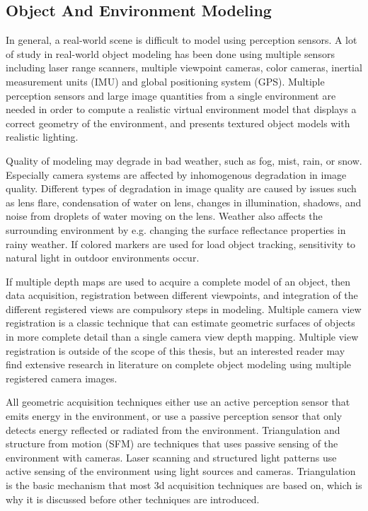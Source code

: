 \documentclass[12pt,a4paper,oneside,pdftex]{report}
\begin{document}
{\subsection{Object And Environment Modeling}
\label{subsection:object_and_environment_modeling}

In general, a real-world scene is difficult to model using perception sensors. A lot of study in real-world object modeling has been done using multiple sensors including laser range scanners, multiple viewpoint cameras, color cameras, inertial measurement units (IMU) and global positioning system (GPS). Multiple perception sensors and large image quantities from a single environment are needed in order to compute a realistic virtual environment model that displays a correct geometry of the environment, and presents textured object models with realistic lighting. \citep{ElHakim98}

Quality of modeling may degrade in bad weather, such as fog, mist, rain, or snow. Especially camera systems are affected by inhomogenous degradation in image quality. Different types of degradation in image quality are caused by issues such as lens flare, condensation of water on lens, changes in illumination, shadows, and noise from droplets of water moving on the lens. Weather also affects the surrounding environment by e.g. changing the surface reflectance properties in rainy weather. If colored markers are used for load object tracking, sensitivity to natural light in outdoor environments occur. \citep{Kawai12} 

If multiple depth maps are used to acquire a complete model of an object, then data acquisition, registration between different viewpoints, and integration of the different registered views are compulsory steps in modeling.  Multiple camera view registration is a classic technique that can estimate geometric surfaces of objects in more complete detail than a single camera view depth mapping. Multiple view registration is outside of the scope of this thesis, but an interested reader may find extensive research in literature on complete object modeling using multiple registered camera images. \citep{Chen91}

All geometric acquisition techniques either use an active perception sensor that emits energy in the environment, or use a passive perception sensor that only detects energy reflected or radiated from the environment. Triangulation and structure from motion (SFM) are techniques that uses passive sensing of the environment with cameras. Laser scanning and structured light patterns use active sensing of the environment using light sources and cameras.
Triangulation is the basic mechanism that most 3d acquisition techniques are based on, which is why it is discussed before other techniques are introduced.

}
\end{document}
